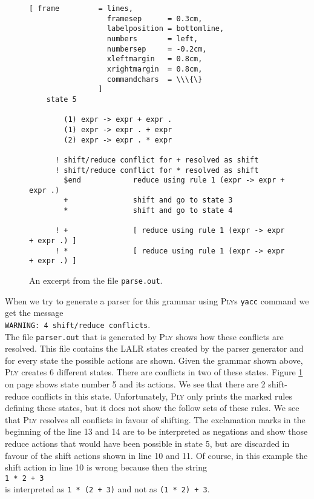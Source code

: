 \begin{figure}[!ht]
\centering
\begin{Verbatim}[ frame         = lines, 
                  framesep      = 0.3cm, 
                  labelposition = bottomline,
                  numbers       = left,
                  numbersep     = -0.2cm,
                  xleftmargin   = 0.8cm,
                  xrightmargin  = 0.8cm,
                  commandchars  = \\\{\}
                ]
    state 5
    
        (1) expr -> expr + expr .
        (1) expr -> expr . + expr
        (2) expr -> expr . * expr
    
      ! shift/reduce conflict for + resolved as shift
      ! shift/reduce conflict for * resolved as shift
        $end            reduce using rule 1 (expr -> expr + expr .)
        +               shift and go to state 3
        *               shift and go to state 4
    
      ! +               [ reduce using rule 1 (expr -> expr + expr .) ]
      ! *               [ reduce using rule 1 (expr -> expr + expr .) ]
\end{Verbatim} 
\vspace*{-0.3cm}
\caption{An excerpt from the file \texttt{parse.out}.}
\label{fig:Conflicts.ipynb:state10}
\end{figure} %

When we try to generate a parser for this grammar using \textsc{Ply}s \texttt{yacc} command we get the message
\\[0.2cm]
\hspace*{1.3cm}
\texttt{WARNING: 4 shift/reduce conflicts}.
\\[0.2cm]
The file \texttt{parser.out} that is generated by \textsc{Ply} shows how these conflicts are resolved.
This file contains the LALR states created by the parser generator and for every state the possible actions are
shown.  Given the grammar shown above, \textsc{Ply} creates 6 different states.  There are conflicts in two of
these states.  Figure \ref{fig:Conflicts.ipynb:state10} on page \pageref{fig:Conflicts.ipynb:state10} shows state
number 5 and its actions.   We see that there are 2 shift-reduce conflicts in this state.  Unfortunately,
\textsc{Ply} only prints the marked rules defining these states, but it does not show the follow sets of these
rules.  We see that \textsc{Ply} resolves all conflicts in favour of shifting.  The exclamation marks in the
beginning of the line 13 and 14 are to be interpreted as negations and show those reduce actions that would have
been possible in state 5, but are discarded in favour of the shift actions shown in line 10 and 11.
Of course, in this example the shift action in line 10 is wrong because then the string
\\[0.2cm]
\hspace*{1.3cm}
\texttt{1 * 2 + 3}
\\[0.2cm]
is interpreted as \texttt{1 * (2 + 3)} and not as \texttt{(1 * 2) + 3}.
\FloatBarrier


